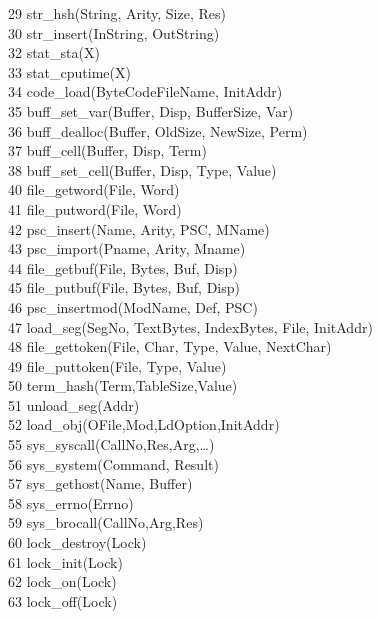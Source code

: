 \documentclass[11pt]{article}
\begin{document}
\begin{tabbing}
29 \> str\_hsh(String, Arity, Size, Res)\>			\\
30 \> str\_insert(InString, OutString)	\>			\\
32 \> stat\_sta(X)			\>			\\
33 \> stat\_cputime(X)			\>			\\
34 \> code\_load(ByteCodeFileName, InitAddr)\>			\\
35 \> buff\_set\_var(Buffer, Disp, BufferSize, Var)\>		\\
36 \> buff\_dealloc(Buffer, OldSize, NewSize, Perm)\>		\\
37 \> buff\_cell(Buffer, Disp, Term)	\>			\\
38 \> buff\_set\_cell(Buffer, Disp, Type, Value)\>		\\
40 \> file\_getword(File, Word)		\>			\\
41 \> file\_putword(File, Word)		\>			\\
42 \> psc\_insert(Name, Arity, PSC, MName)\>			\\
43 \> psc\_import(Pname, Arity, Mname)	\>			\\
44 \> file\_getbuf(File, Bytes, Buf, Disp)\>			\\
45 \> file\_putbuf(File, Bytes, Buf, Disp)\>			\\
46 \> psc\_insertmod(ModName, Def, PSC)	\>			\\
47 \> load\_seg(SegNo, TextBytes, IndexBytes, File, InitAddr)\>		\\
48 \> file\_gettoken(File, Char, Type,	Value, NextChar)\>		\\
49 \> file\_puttoken(File, Type, Value)	\>			\\
50 \> term\_hash(Term,TableSize,Value)	\>			\\
51 \> unload\_seg(Addr)			\>			\\
52 \> load\_obj(OFile,Mod,LdOption,InitAddr) \>			\\
55 \> sys\_syscall(CallNo,Res,Arg,\ldots) \>			\\
56 \> sys\_system(Command, Result)	\>			\\
57 \> sys\_gethost(Name, Buffer)	\>			\\
58 \> sys\_errno(Errno)			\>			\\
59 \> sys\_brocall(CallNo,Arg,Res)	\>			\\
60 \> lock\_destroy(Lock)		\>			\\
61 \> lock\_init(Lock)			\>			\\
62 \> lock\_on(Lock)			\>			\\
63 \> lock\_off(Lock)			\>			\\

\end{tabbing}
\end{document}
